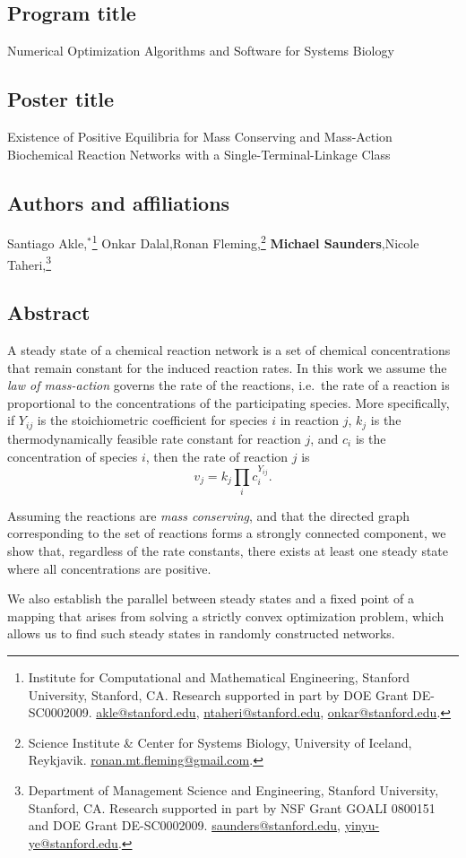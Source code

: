 \documentclass[11pt]{article}
\date{}
\newcommand*{\0}{\mathbf{0}}
\newcommand*{\1}{\mathbf{1}}
\begin{document}
\subsection*{Program title}

Numerical Optimization Algorithms and Software for Systems Biology


\subsection*{Poster title}

Existence of Positive Equilibria for Mass Conserving and Mass-Action
Biochemical Reaction Networks with a Single-Terminal-Linkage Class


\subsection*{Authors and affiliations}

Santiago Akle,$^*$\footnote{Institute for Computational and Mathematical Engineering,
           Stanford University, Stanford, CA.
           Research supported in part by DOE Grant DE-SC0002009.
           \url{akle@stanford.edu}, \url{ntaheri@stanford.edu}, \url{onkar@stanford.edu}.}
Onkar Dalal,\footnotemark[1]
Ronan Fleming,\footnote{Science Institute \& Center for Systems
           Biology, University of Iceland, Reykjavik.
           \url{ronan.mt.fleming@gmail.com}.}
{\bf Michael Saunders},\footnotemark[3]
Nicole Taheri,\footnote{Department of Management Science and Engineering,
           Stanford University, Stanford, CA.
           Research supported in part by NSF Grant GOALI 0800151 and DOE Grant DE-SC0002009.
           \url{saunders@stanford.edu}, \url{yinyu-ye@stanford.edu}.}
        
      
\subsection*{Abstract}

A steady state of a chemical reaction network is a set of chemical
concentrations that remain constant for the induced reaction rates.
In this work we assume the \emph{law of mass-action} governs the rate
of the reactions, i.e.\ the rate of a reaction is proportional to the
concentrations of the participating species. More specifically, if
$Y_{ij}$ is the stoichiometric coefficient for species $i$ in reaction
$j$, $k_{j}$ is the thermodynamically feasible rate constant for
reaction $j$, and $c_i$ is the concentration of species $i$, then the
rate of reaction $j$ is
\[v_j = k_j\prod_ic_i^{Y_{ij}}.\]

Assuming the reactions are \emph{mass conserving}, and that the
directed graph corresponding to the set of reactions forms a strongly
connected component, we show that, regardless of the rate constants,
there exists at least one steady state where all concentrations are
positive.

We also establish the parallel between steady states and a fixed point
of a mapping that arises from solving a strictly convex optimization
problem, which allows us to find such steady states in randomly
constructed networks.
\end{document}
